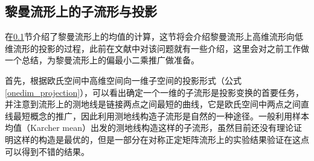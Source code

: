 \subsection{黎曼流形上的子流形与投影}
\label{sec:riemannian_mean}
在\ref{sec:riemannian_mean}节介绍了黎曼流形上的均值的计算，这节将会介绍黎曼流形上高维流形向低维流形的投影的过程，此前在文献\cite{PGA,RCCA}中对该问题就有一些介绍，这里会对之前工作做一个总结，为黎曼流形上的偏最小二乘推广做准备。

首先，根据欧氏空间中高维空间向一维子空间的投影形式（公式\ref{onedim_projection}），可以看出确定一个一维的子流形是投影变换的首要任务，并注意到流形上的测地线是链接两点之间最短的曲线，它是欧氏空间中两点之间直线最短概念的推广，因此利用测地线构造子流形是自然的一种途径。一般利用样本均值（Karcher mean）出发的测地线构造这样的子流形，虽然目前还没有理论证明这样的构造是最优的，但是一部分在对称正定矩阵流形上的实验结果验证在这点可以得到不错的结果\cite{RegionCov_pedestrain}。

